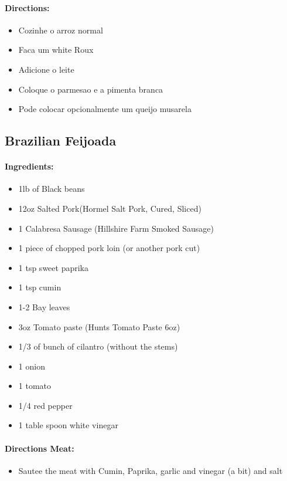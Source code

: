 \documentclass{article}
\begin{document}
\paragraph{Directions:}
\begin{itemize}
	\item Cozinhe o arroz normal
	\item Faca um white Roux
	\item Adicione o leite
	\item Coloque o parmesao e a pimenta branca
	\item Pode colocar opcionalmente um queijo musarela
\end{itemize} 

\subsection{Brazilian Feijoada}

\paragraph{Ingredients:}

\begin{itemize}
	\item 1lb of Black beans 
	\item 12oz Salted Pork(Hormel Salt Pork, Cured, Sliced)
	\item 1 Calabresa Sausage (Hillshire Farm Smoked Sausage)
	\item 1 piece of chopped pork loin (or another pork cut)
	\item 1 tsp sweet paprika
	\item 1 tsp cumin
	\item 1-2 Bay leaves 
	\item 3oz Tomato paste (Hunts Tomato Paste 6oz)
	\item 1/3 of bunch of cilantro (without the stems)
	\item 1 onion 
	\item 1 tomato 
	\item 1/4 red pepper 
	\item 1 table spoon white vinegar
\end{itemize}

\paragraph{Directions Meat:}
\begin{itemize}
	\item Sautee the meat with Cumin, Paprika, garlic and vinegar (a bit) and salt
\end{itemize}
\end{document}
